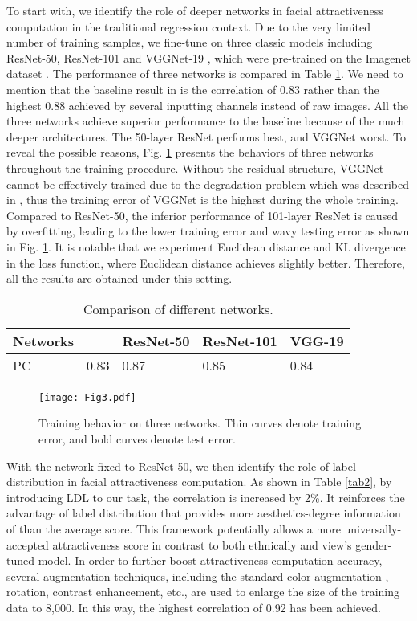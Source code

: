 \documentclass[preprint,5p,times,twocolumn]{elsarticle}
\begin{document}
To start with, we identify the role of deeper networks in facial attractiveness computation in the traditional regression context. Due to the very limited number of training samples, we fine-tune on three classic models including ResNet-50, ResNet-101 and VGGNet-19 \cite{ICLR15_VGGNet}, which were pre-trained on the Imagenet dataset \cite{CVPR09_Imagenet}.
The performance of three networks is compared in Table \ref{tab1}. We need to mention that the baseline result in \cite{arXiv15_Xu} is the correlation of 0.83 rather than the highest 0.88 achieved by several inputting channels instead of raw images. All the three networks achieve superior performance to the baseline because of the much deeper architectures. The 50-layer ResNet performs best, and VGGNet worst. To reveal the possible reasons, Fig. \ref{fig3} presents the behaviors of three networks throughout the training procedure. Without the residual structure, VGGNet cannot be effectively trained due to the degradation problem which was described in \cite{CVPR16_ResNet}, thus the training error of VGGNet is the highest during the whole training. Compared to ResNet-50, the inferior performance of 101-layer ResNet is caused by overfitting, leading to the lower training error and wavy testing error as shown in Fig. \ref{fig3}. It is notable that we experiment Euclidean distance and KL divergence in the loss function, where Euclidean distance achieves slightly better. Therefore, all the results are obtained under this setting.

\begin{table}[!hbp]\footnotesize
\caption{Comparison of different networks.}
\label{tab1}
\begin{tabular}{|l|l|l|l|l|}
\hline
Networks & \cite{arXiv15_Xu} & ResNet-50 & ResNet-101 & VGG-19 \\
\hline
PC & 0.83 & 0.87 & 0.85 & 0.84 \\
\hline
\end{tabular}
\end{table}



\begin{figure}[!h]
\centering
\texttt{[image: Fig3.pdf]}
\caption{Training behavior on three networks. Thin curves denote training error, and bold curves denote test error.}
\label{fig3}
\end{figure}


With the network fixed to ResNet-50, we then identify the role of label distribution in facial attractiveness computation. As shown in Table \ref{tab2}, by introducing LDL to our task, the correlation is increased by 2\%. It reinforces the advantage of label distribution that provides more aesthetics-degree information of than the average score. This framework potentially allows a more universally-accepted attractiveness score in contrast to both ethnically and view's gender-tuned model. In order to further boost attractiveness computation accuracy, several augmentation techniques, including the standard color augmentation \cite{NIPS12_AlexNet}, rotation, contrast enhancement, etc., are used to enlarge the size of the training data to 8,000. In this way, the highest correlation of 0.92 has been achieved.
\end{document}
